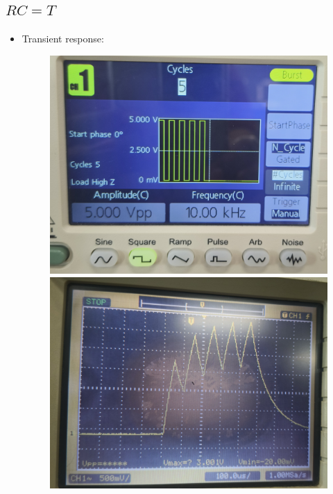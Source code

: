 \documentclass[12pt,a4paper]{report}
\begin{document}
\subsection{$RC = T$}
\begin{itemize}
    \item Transient response:
    \begin{figure}[H] %
    \centering
    \begin{minipage}[c]{0.48\textwidth}
        \includegraphics[width=\textwidth]{figs/t1.jpg} %
        
    \end{minipage}
    \hfill
    \begin{minipage}[c]{0.48\textwidth}
        \includegraphics[width=\textwidth]{figs/tr1.jpg} %
        

\end{minipage}
\end{figure}
\end{itemize}
\end{document}
